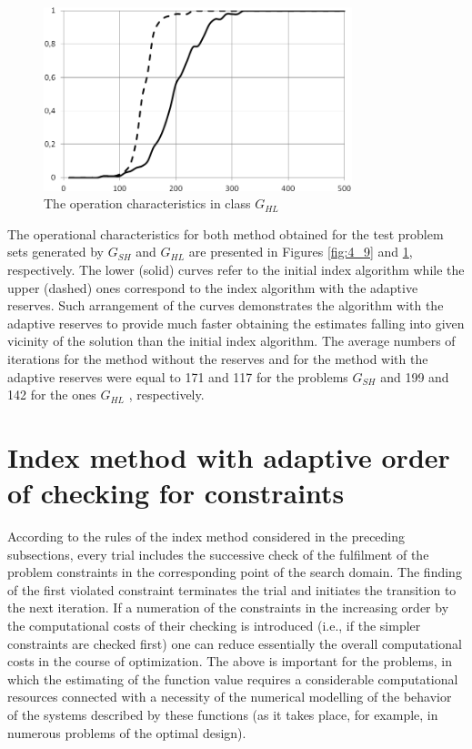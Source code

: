 \begin{figure}[ht]
  \centering
  \includegraphics[width=0.8\textwidth]{figures/4_10.png}
  \caption{The operation characteristics in class $G_{HL}$}
  \label{fig:4_10}
\end{figure}

The operational characteristics for both method obtained for the test problem sets generated by $G_{SH}$ and $G_{HL}$ are presented in Figures \ref{fig:4_9} and \ref{fig:4_10}, respectively. The lower (solid) curves refer to the initial index algorithm while the upper (dashed) ones correspond to the index algorithm with the adaptive reserves. Such arrangement of the curves demonstrates the algorithm with the
adaptive reserves to provide much faster obtaining the estimates falling into given vicinity of the solution than the initial index algorithm. The average numbers of iterations for the method
without the reserves and for the method with the adaptive reserves were equal to 171 and 117 for the problems $G_{SH}$ and 199 and 142 for the ones $G_{HL}$ , respectively.

\section{Index method with adaptive order of checking for constraints}
According to the rules of the index method considered in the preceding subsections, every trial includes the successive check of the fulfilment of the problem constraints in the corresponding point of the search domain. The finding of the first violated constraint terminates the trial and initiates the transition to the next iteration. If a numeration of the constraints in the increasing order by the computational costs of their checking is introduced (i.e., if the simpler constraints are checked first) one can reduce essentially the overall computational costs in the course of optimization. The above is important for the problems, in which the estimating of the function value requires a considerable computational resources connected with a necessity of the numerical modelling of the behavior of the systems described by these functions (as it takes place, for example, in numerous problems of the optimal design).

